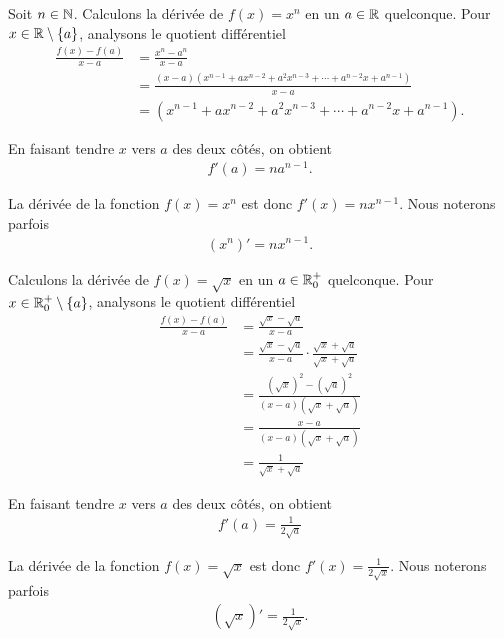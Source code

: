 \documentclass[main.tex]{subfiles}
\begin{document}
\begin{example}
    [Dérivée de $x^n$]

    Soit $n \in \mathbb{N}$.
    Calculons la dérivée de $f(x) = x^n$ en un $a \in \mathbb{R}$ quelconque.
    Pour $x \in \mathbb{R} \setminus \{a\}$,
    analysons le quotient différentiel
    \begin{align}
        \frac {f(x) - f(a)}{x - a}
        &= \frac {x^n - a^n}{x - a}\\
        &= \frac {(x-a)(x^{n-1} + ax^{n-2} + a^2x^{n-3} + \cdots + a^{n-2}x + a^{n-1})}{x - a}\\
        &= (x^{n-1} + ax^{n-2} + a^2x^{n-3} + \cdots + a^{n-2}x + a^{n-1}).
    \end{align}

    En faisant tendre $x$ vers $a$ des deux côtés,
    on obtient
    \begin{align}
        f'(a) = na^{n-1}.
    \end{align}
    
    La dérivée de la fonction $f(x) = x^n$ est donc $f'(x) = n x^{n-1}$.
    Nous noterons parfois
    \begin{align}
        (x^n)'=n x^{n-1}.
    \end{align}
\end{example}

\begin{example}

    Calculons la dérivée de $f(x) = \sqrt x$ en un $a \in \mathbb{R}_0^+$ quelconque.
    Pour $x \in \mathbb{R}_0^+ \setminus \{a\}$,
    analysons le quotient différentiel
    \begin{align}
        \frac {f(x) - f(a)}{x - a}
        &= \frac {\sqrt x - \sqrt a}{x - a}\\
        &= \frac {\sqrt x - \sqrt a}{x - a} \cdot \frac{\sqrt x + \sqrt a}{\sqrt x + \sqrt a}\\
        &= \frac {{(\sqrt x)}^2 - {(\sqrt a)}^2}{(x - a) (\sqrt x + \sqrt a)}\\
        &= \frac {x - a} {(x - a) (\sqrt x + \sqrt a)}\\
        &= \frac 1 {\sqrt x + \sqrt a}
    \end{align}

    En faisant tendre $x$ vers $a$ des deux côtés,
    on obtient
    \begin{align}
        f'(a) = \frac 1 {2 \sqrt a}
    \end{align}
    
    La dérivée de la fonction $f(x) = \sqrt x$ est donc $f'(x) = \frac 1 {2 \sqrt x}$.
    Nous noterons parfois
    \begin{align}
        (\sqrt x)'=\frac 1 {2 \sqrt x}.
    \end{align}
\end{example}
\end{document}
